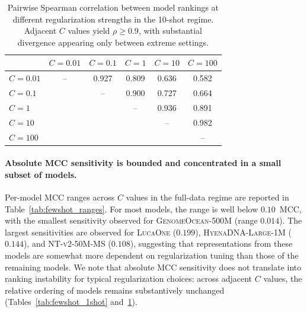\documentclass{article}
\theoremstyle{plain}
\theoremstyle{definition}
\theoremstyle{remark}
\begin{document}
\begin{table}[h]
\centering
\caption{Pairwise Spearman correlation between model rankings at
different regularization strengths in the 10-shot regime. Adjacent
$C$ values yield $\rho \geq 0.9$, with substantial divergence appearing
only between extreme settings.}
\label{tab:fewshot_10shot}
\small
\begin{tabular}{@{}lccccc@{}}
\toprule
 & $C=0.01$ & $C=0.1$ & $C=1$ & $C=10$ & $C=100$ \\
\midrule
$C=0.01$  &  --    & 0.927 & 0.809 & 0.636 & 0.582 \\
$C=0.1$   &       &  --    & 0.900 & 0.727 & 0.664 \\
$C=1$     &       &       &  --    & 0.936 & 0.891 \\
$C=10$    &       &       &       &  --    & 0.982 \\
$C=100$   &       &       &       &       &  --    \\
\bottomrule
\end{tabular}
\end{table}

\paragraph{Absolute MCC sensitivity is bounded and concentrated in a small subset of models.}
Per-model MCC ranges across $C$ values in the full-data regime are
reported in Table~\ref{tab:fewshot_ranges}. For most models, the range
is well below $0.10$~MCC, with the smallest sensitivity observed for
\textsc{GenomeOcean-500M} (range $0.014$). The largest sensitivities
are observed for \textsc{LucaOne} ($0.199$),
\textsc{HyenaDNA-Large-1M} ($0.144$), and \textsc{NT-v2-50M-MS}
($0.108$), suggesting that representations from these models are
somewhat more dependent on regularization tuning than those of the
remaining models. We note that absolute MCC sensitivity does not
translate into ranking instability for typical regularization choices:
across adjacent $C$ values, the relative ordering of models remains
substantively unchanged
(Tables~\ref{tab:fewshot_1shot} and~\ref{tab:fewshot_10shot}).
\end{document}
